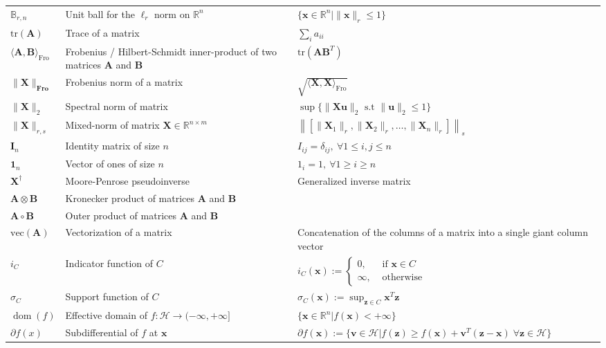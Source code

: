 \documentclass[nobib, a4paper, notoc, twoside, justified, openany]{tufte-book}
\providecommand{\B}[1]{\mathbf{#1}}
\DeclareMathOperator{\dom}{dom}
\begin{document}
\begin{fullwidth}
\begin{longtable}{p{3cm} | p{6cm} | p{7.5cm}}
  $\mathbb B_{r,n}$ & Unit ball for the $\ell_r$ norm on $\mathbb R^n$ & $\{\B{x} \in \mathbb{R}^n|\|\B{x}\|_r \le 1\}$ \\
$\text{tr}(\B{A})$ & Trace of a matrix & $\sum_{i} a_{ii}$ \\  
$\langle \B{A}, \B{B}\rangle_{\text{Fro}}$ & Frobenius / Hilbert-Schmidt inner-product of two matrices $\B{A}$ and $\B{B}$  & $\text{tr}(\B{A}\B{B}^T)$\\
  $\| \B{X} \|_{\textbf{Fro}}$ & Frobenius norm of a matrix & $\sqrt{\langle \B{X}, \B{X}\rangle_{\text{Fro}}}$ \\
  $\|\B{X}\|_2$ & Spectral norm of matrix & $\sup\{\|\B{X}\B{u}\|_2 \text{ s.t } \|\B{u}\|_2 \le 1\}$ \\
  $\|\B{X}\|_{r,s}$ & Mixed-norm of matrix $\B{X} \in \mathbb R^{n \times m}$ &  $\left\|\left[\|\B{X}_1\|_r,\|\B{X}_2\|_r,\ldots,\|\B{X}_n\|_r\right]\right\|_s$ \\
$\B{I}_n$ & Identity matrix of size $n$ &  $I_{ij} = \delta_{ij}, ~\forall 1 \leq i, j \leq n$\\
$\B{1}_n$ & Vector of ones of size $n$ &  $1_{i} = 1, ~\forall 1 \geq i \geq n$ \\
$\B{X}^{\dagger}$ & Moore-Penrose pseudoinverse & Generalized inverse matrix\\
$\B{A}\otimes\B{B}$ & Kronecker product of matrices $\B{A}$ and $\B{B}$ & \\
$\B{A}\circ\B{B}$ & Outer product of matrices $\B{A}$ and $\B{B}$ & \\

$\text{vec}(\B{A})$ & Vectorization of a matrix & Concatenation of the columns of a matrix into a single giant column vector\\


\midrule
$i_C$ & Indicator function of $C$ & $i_C(\B{x}):= \begin{cases}0,&\mbox{ if }\B{x} \in C\\\infty,&\mbox{ otherwise}\end{cases}$\\
  $\sigma_C$ & Support function of $C$ & $\sigma_C(\B{x}) := \sup_{\B{z} \in C}\B{x}^T\B{z}$\\
  $ \dom(f)$ & Effective domain of $f: \mathcal H \rightarrow (-\infty,+\infty]$ & $\{\B{x} \in \mathbb{R}^n | f(\B{x}) < +\infty\}$ \\  
  $\partial f(x)$ & Subdifferential of $f$ at $\B{x}$ & $\partial f(\B{x}) := \{\B{v} \in \mathcal H | f(\B{z}) \ge f(\B{x}) + \B{v}^T(\B{z} - \B{x})\; \forall \B{z} \in \mathcal H\}$\\


\end{longtable}
\end{fullwidth}
\end{document}
